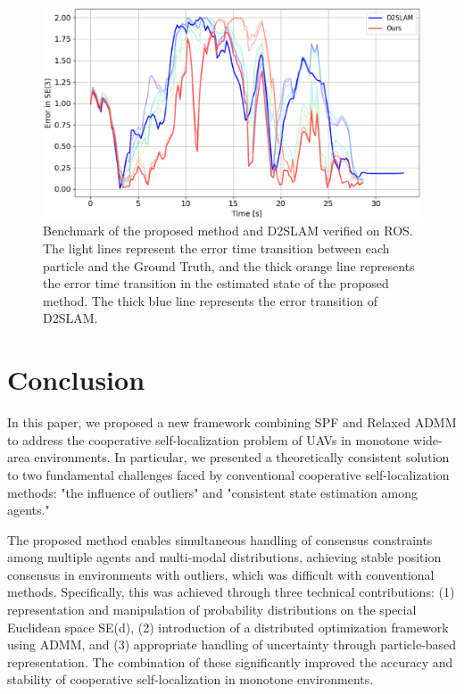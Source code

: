 \documentclass[a4paper,fleqn,10pt,twocolumn]{SICE_ISCS}
\begin{document}
\begin{figure}[t]
	\begin{center}
		\includegraphics[width=\linewidth]{Fig/benchmark.eps}
		\caption{Benchmark of the proposed method and D2SLAM verified on ROS. The light lines represent the error time transition between each particle and the Ground Truth, and the thick orange line represents the error time transition in the estimated state of the proposed method. The thick blue line represents the error transition of D2SLAM.}
		\label{fig:benchmark}
	\end{center}
	\vspace{-2mm}
\end{figure}

\section{Conclusion}

In this paper, we proposed a new framework combining SPF and Relaxed ADMM to address the cooperative self-localization problem of UAVs in monotone wide-area environments.
In particular, we presented a theoretically consistent solution to two fundamental challenges faced by conventional cooperative self-localization methods: "the influence of outliers" and "consistent state estimation among agents."

The proposed method enables simultaneous handling of consensus constraints among multiple agents and multi-modal distributions, achieving stable position consensus in environments with outliers, which was difficult with conventional methods.
Specifically, this was achieved through three technical contributions: (1) representation and manipulation of probability distributions on the special Euclidean space SE(d), (2) introduction of a distributed optimization framework using ADMM, and (3) appropriate handling of uncertainty through particle-based representation. The combination of these significantly improved the accuracy and stability of cooperative self-localization in monotone environments.
\end{document}
